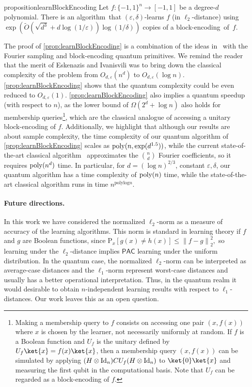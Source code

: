 \documentclass[11pt]{article}
\newcommand{\norm}[1]{\left\|{#1}\right\|}
\newcommand{\eps}{\varepsilon}
\theoremstyle{plain}
\newcommand{\Id}{\ensuremath{\mathop{\rm Id}\nolimits}}
\newcommand{\poly}{\mbox{\rm poly}}
\theoremstyle{plain}
\theoremstyle{definition}
\theoremstyle{remark}
\theoremstyle{named}
\begin{document}
\begin{restatable}{proposition}{learnBlockEncoding}\label{prop:learnBlockEncoding}
    Let $f:\{-1,1\}^n\to [-1,1]$ be a degree-$d$ polynomial. There is an algorithm~that $(\varepsilon,
    \delta)$-learns $f$ (in $\ell_2$-distance)  using $\exp(\widetilde{O}(\sqrt{d^{3}}+d\log(1/\eps)) \log (1/\delta))$ copies of a block-encoding~of~$f$.
\end{restatable}
The proof of \cref{prop:learnBlockEncoding} is a combination of the ideas in~\cite{eskenazis2022learning} with the Fourier sampling and block-encoding quantum primitives. We remind the reader that the merit of Eskenazis and Ivanisvili was to bring down the classical complexity of the problem from $O_{d,\eps}(n^d)$ to $O_{d,\eps}(\log n)$. \cref{prop:learnBlockEncoding} shows that the quantum complexity could be even reduced to $O_{d,\eps}(1)$. \cref{prop:learnBlockEncoding} also implies a quantum speedup (with respect to $n$), as the lower bound of $\Omega(2^d+\log n)$ also holds for membership queries\footnote{Making a membership query to $f$ consists on accessing one pair $(x,f(x))$ where $x$ is chosen by the learner, not necessarily uniformly at random. If $f$ is a Boolean function and $U_f$ is the unitary defined by $U_f\ket{x}=f(x)\ket{x}$, then a membership query $(x,f(x))$ can be simulated by applying $(H\otimes \Id_n)CU_f(H\otimes \Id_n)$ to $\ket{0}\ket{x}$ and measuring the first qubit in the computational basis. Note that $U_f$ can be regarded as a block-encoding of $f$.}, which are the classical analogue of accessing a unitary block-encoding of $f$. 
Additionally, we highlight that although our results are about sample complexity,  the time complexity of our quantum algorithm of \cref{prop:learnBlockEncoding} scales as $\poly(n,\exp(d^{1.5}))$, while the current state-of-the-art classical algorithm~\cite{eskenazis2022learning} approximates the ${n \choose d}$ Fourier coefficients, so it requires $\poly(n^d)$ time. In particular, for $d=(\log n)^{2/3}$, constant $\eps,\delta$, our quantum algorithm has a time complexity of $\poly(n)$ time, while the state-of-the-art classical algorithm runs in time $n^{\mathrm{polylog} n}$. 

\paragraph{Future directions.}
In this work we have considered the normalized $\ell_2$-norm as a  measure of accuracy of the learning algorithms. This norm is standard in learning theory if $f$ and $g$ are Boolean functions, since  $\mathrm{P}_{x}[g(x)\neq h(x)]\leq \norm{f-g}_2^2,$ so learning under the $\ell_2$-distance implies $\textsf{PAC}$ learning under the uniform distribution. In the quantum case, the normalized $\ell_2$-norm can be interpreted as average-case distances and the $\ell_1$-norm represent worst-case distances and usually has a better operational interpretation. Thus, in the quantum realm it would desirable to obtain $n$-independent learning results with respect to $\ell_1$-distances. Our work leaves this as an open question.
\end{document}
